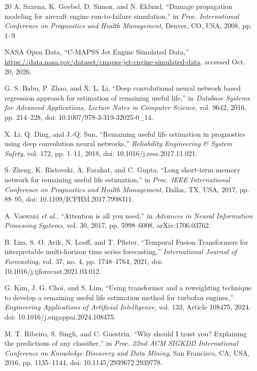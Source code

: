 \documentclass[conference]{IEEEtran}
\begin{document}
\balance
\begin{thebibliography}{20}
A. Saxena, K. Goebel, D. Simon, and N. Eklund, ``Damage propagation modeling for aircraft engine run-to-failure simulation,'' in \emph{Proc. International Conference on Prognostics and Health Management}, Denver, CO, USA, 2008, pp. 1--9.

NASA Open Data, ``C-MAPSS Jet Engine Simulated Data,'' \url{https://data.nasa.gov/dataset/cmapss-jet-engine-simulated-data}, accessed Oct. 20, 2026.

G. S. Babu, P. Zhao, and X. L. Li, ``Deep convolutional neural network based regression approach for estimation of remaining useful life,'' in \emph{Database Systems for Advanced Applications, Lecture Notes in Computer Science}, vol. 9642, 2016, pp. 214--228, doi: 10.1007/978-3-319-32025-0\_14.

X. Li, Q. Ding, and J.-Q. Sun, ``Remaining useful life estimation in prognostics using deep convolution neural networks,'' \emph{Reliability Engineering \& System Safety}, vol. 172, pp. 1--11, 2018, doi: 10.1016/j.ress.2017.11.021.

S. Zheng, K. Ristovski, A. Farahat, and C. Gupta, ``Long short-term memory network for remaining useful life estimation,'' in \emph{Proc. IEEE International Conference on Prognostics and Health Management}, Dallas, TX, USA, 2017, pp. 88--95, doi: 10.1109/ICPHM.2017.7998311.

A. Vaswani \emph{et al.}, ``Attention is all you need,'' in \emph{Advances in Neural Information Processing Systems}, vol. 30, 2017, pp. 5998--6008, arXiv:1706.03762.

B. Lim, S. O. Arik, N. Loeff, and T. Pfister, ``Temporal Fusion Transformers for interpretable multi-horizon time series forecasting,'' \emph{International Journal of Forecasting}, vol. 37, no. 4, pp. 1748--1764, 2021, doi: 10.1016/j.ijforecast.2021.03.012.

G. Kim, J. G. Choi, and S. Lim, ``Using transformer and a reweighting technique to develop a remaining useful life estimation method for turbofan engines,'' \emph{Engineering Applications of Artificial Intelligence}, vol. 133, Article 108475, 2024, doi: 10.1016/j.engappai.2024.108475.

M. T. Ribeiro, S. Singh, and C. Guestrin, ``Why should I trust you? Explaining the predictions of any classifier,'' in \emph{Proc. 22nd ACM SIGKDD International Conference on Knowledge Discovery and Data Mining}, San Francisco, CA, USA, 2016, pp. 1135--1144, doi: 10.1145/2939672.2939778.


\end{thebibliography}
\end{document}
